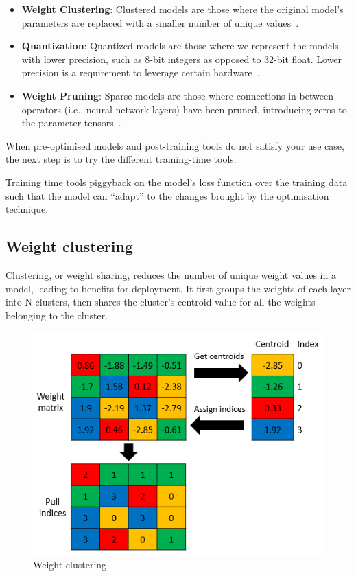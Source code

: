 \begin{itemize}
    \item \textbf{Weight Clustering}: Clustered models are those where the
        original model's parameters are replaced with a smaller number of
        unique values~\cite{tfmot:intro}.
    \item \textbf{Quantization}: Quantized models are those where we represent
        the models with lower precision, such as 8-bit integers as opposed to
        32-bit float. Lower precision is a requirement to leverage certain
        hardware~\cite{tfmot:intro}.
    \item \textbf{Weight Pruning}: Sparse models are those where connections in
        between operators (i.e., neural network layers) have been pruned,
        introducing zeros to the parameter tensors~\cite{tfmot:intro}.
\end{itemize}

When pre-optimised models and post-training tools do not satisfy your use case,
the next step is to try the different training-time tools.

Training time tools piggyback on the model's loss function over the training
data such that the model can ``adapt'' to the changes brought by the
optimisation technique.~\cite{tfmot:intro}

\subsection{Weight clustering}
Clustering, or weight sharing, reduces the number of unique weight values in a
model, leading to benefits for deployment. It first groups the weights of each
layer into N clusters, then shares the cluster's centroid value for all the
weights belonging to the cluster.

\begin{figure}[ht]
    \includegraphics[width=\textwidth]{images/introduction/weight_clustering.png}
    \centering
    \caption{Weight clustering}\label{fig:weight_clustering}
\end{figure}

